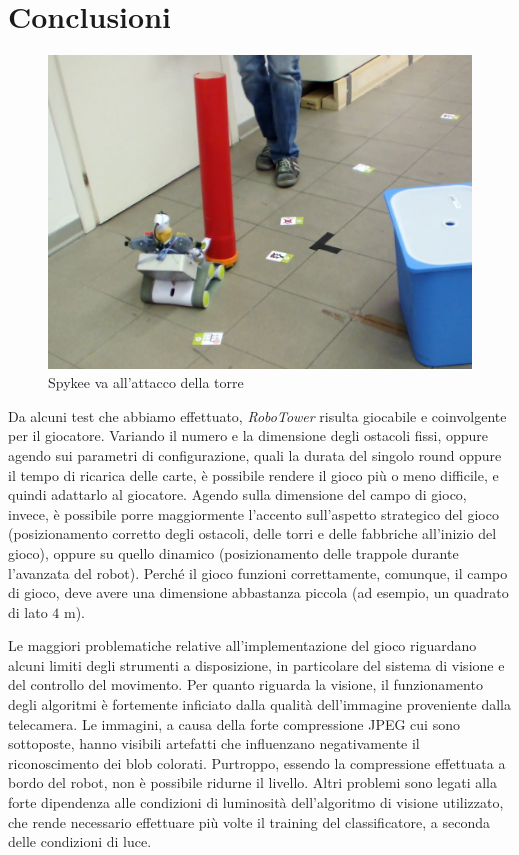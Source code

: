 \chapter{Conclusioni}
\label{cap:conclusioni}

\begin{figure}
\centering
\includegraphics[scale=0.3]{images/attaccotorre}
\caption{Spykee va all'attacco della torre}
\end{figure}

Da alcuni test che abbiamo effettuato, \emph{RoboTower} risulta giocabile e coinvolgente per il giocatore. Variando il numero e la dimensione degli ostacoli fissi, oppure agendo sui parametri di configurazione, quali la durata del singolo round oppure il tempo di ricarica delle carte, è possibile rendere il gioco più o meno difficile, e quindi adattarlo al giocatore. Agendo sulla dimensione del campo di gioco, invece, è possibile porre maggiormente l'accento sull'aspetto strategico del gioco (posizionamento corretto degli ostacoli, delle torri e delle fabbriche all'inizio del gioco), oppure su quello dinamico (posizionamento delle trappole durante l'avanzata del robot). Perché il gioco funzioni correttamente, comunque, il campo di gioco, deve avere una dimensione abbastanza piccola (ad esempio, un quadrato di lato $4$ m).

Le maggiori problematiche relative all'implementazione del gioco riguardano alcuni limiti degli strumenti a disposizione, in particolare del sistema di visione e del controllo del movimento. Per quanto riguarda la visione, il funzionamento degli algoritmi è fortemente inficiato dalla qualità dell'immagine proveniente dalla telecamera. Le immagini, a causa della forte compressione JPEG cui sono sottoposte, hanno visibili artefatti che influenzano negativamente il riconoscimento dei blob colorati. Purtroppo, essendo la compressione effettuata a bordo del robot, non è possibile ridurne il livello. Altri problemi sono legati alla forte dipendenza alle condizioni di luminosità dell'algoritmo di visione utilizzato, che rende necessario effettuare più volte il training del classificatore, a seconda delle condizioni di luce.

